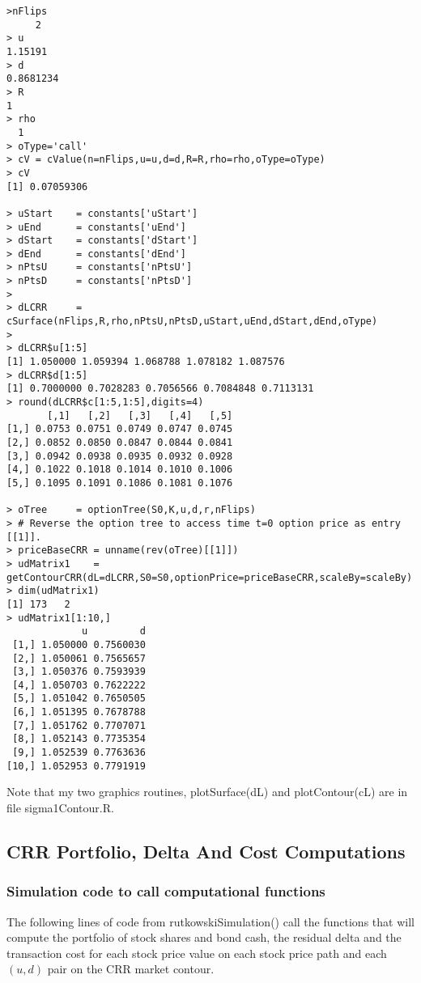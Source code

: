 \documentclass[10pt]{article}
\begin{document}
\begin{verbatim}
>nFlips
     2
> u
1.15191
> d
0.8681234
> R
1
> rho
  1
> oType='call'
> cV = cValue(n=nFlips,u=u,d=d,R=R,rho=rho,oType=oType)
> cV
[1] 0.07059306

> uStart    = constants['uStart']
> uEnd      = constants['uEnd']
> dStart    = constants['dStart']
> dEnd      = constants['dEnd']
> nPtsU     = constants['nPtsU']
> nPtsD     = constants['nPtsD']
>
> dLCRR     = cSurface(nFlips,R,rho,nPtsU,nPtsD,uStart,uEnd,dStart,dEnd,oType)
>
> dLCRR$u[1:5]
[1] 1.050000 1.059394 1.068788 1.078182 1.087576
> dLCRR$d[1:5]
[1] 0.7000000 0.7028283 0.7056566 0.7084848 0.7113131
> round(dLCRR$c[1:5,1:5],digits=4)
       [,1]   [,2]   [,3]   [,4]   [,5]
[1,] 0.0753 0.0751 0.0749 0.0747 0.0745
[2,] 0.0852 0.0850 0.0847 0.0844 0.0841
[3,] 0.0942 0.0938 0.0935 0.0932 0.0928
[4,] 0.1022 0.1018 0.1014 0.1010 0.1006
[5,] 0.1095 0.1091 0.1086 0.1081 0.1076

> oTree     = optionTree(S0,K,u,d,r,nFlips)
> # Reverse the option tree to access time t=0 option price as entry [[1]].
> priceBaseCRR = unname(rev(oTree)[[1]])
> udMatrix1    = getContourCRR(dL=dLCRR,S0=S0,optionPrice=priceBaseCRR,scaleBy=scaleBy)
> dim(udMatrix1)
[1] 173   2
> udMatrix1[1:10,]
             u         d
 [1,] 1.050000 0.7560030
 [2,] 1.050061 0.7565657
 [3,] 1.050376 0.7593939
 [4,] 1.050703 0.7622222
 [5,] 1.051042 0.7650505
 [6,] 1.051395 0.7678788
 [7,] 1.051762 0.7707071
 [8,] 1.052143 0.7735354
 [9,] 1.052539 0.7763636
[10,] 1.052953 0.7791919
\end{verbatim}
 Note that my two graphics routines, plotSurface(dL) and plotContour(cL) are in file sigma1Contour.R.

\subsection*{CRR Portfolio, Delta And Cost Computations}

\subsubsection*{Simulation code to call computational functions}
The following lines of code from rutkowskiSimulation() call the functions
that will compute the portfolio of stock shares and bond cash, the residual
delta and the transaction cost for each stock price value on each stock price
path and each $(u,d)$ pair on the CRR market contour.
\end{document}
